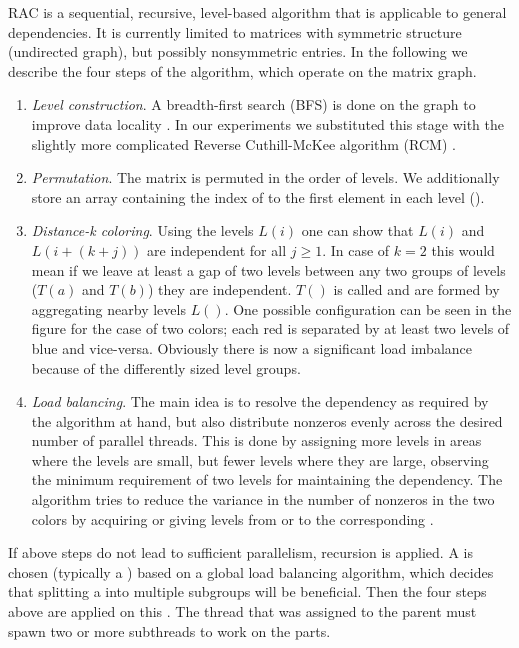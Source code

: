 RAC is a sequential, recursive, level-based algorithm that is applicable to
general \DK dependencies. It is currently limited to matrices
with symmetric structure (undirected graph), but possibly nonsymmetric
entries. In the following we describe the four steps of the
algorithm, which operate on the matrix graph.
\begin{enumerate}
\item \emph{Level construction}.  A breadth-first search (BFS)
  \cite{BFS} is done on the graph to improve data locality
  \cite{RCM_Sparse_computation}. In our experiments we substituted
  this stage with the slightly more complicated Reverse Cuthill-McKee
  algorithm (RCM) \cite{RCM}.
		

\item \emph{Permutation}. The matrix is permuted in the order of
  levels.  We additionally store an array containing the index
  of to the first element in each level (\levelPtr).

		
\item \emph{Distance-k coloring}. Using the levels $L(i)$ one can
  show that $L(i)$ and $L(i+(k+j))$ are \DK independent
  for all $j\geq1$. In case of $k=2$ this would mean if we
  leave at least a gap of two levels between any two groups of levels
  ($T(a)$ and $T(b)$) they are \DTWO independent. $T()$ is called \levelGroups and are formed by aggregating nearby levels $L()$.  One possible
  configuration can be seen in the figure for the case of two colors;
  each red \levelGroup is separated by at least two
  levels of blue and vice-versa. Obviously there is now
  a significant load imbalance because of the differently sized
  level groups.
  		
\item \emph{Load balancing}. The main idea is to resolve the \DK
  dependency as required by the algorithm at hand, but also distribute
  nonzeros evenly across the desired number of parallel threads.  This
  is done by assigning more levels in areas where the levels are
  small, but fewer levels where they are large, observing the minimum
  requirement of two levels for maintaining the \DTWO dependency.
  The algorithm tries to reduce the variance in the number of nonzeros
  in the two colors by acquiring or giving levels from or to the
  corresponding \levelGroup.
\end{enumerate}
If above steps do not lead to sufficient parallelism, recursion is
applied. A \subgraph is chosen  (typically a \levelGroup) based
on a global load balancing algorithm, which decides that splitting
a \levelGroup into multiple subgroups will be beneficial. Then
the four steps above are applied on this \subgraph. The thread
that was assigned to the parent \subgraph must spawn two or more
subthreads to work on the parts. 

